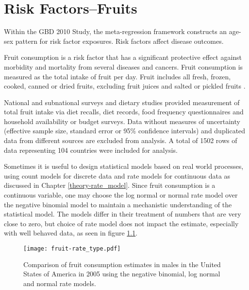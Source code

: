 \chapter{Risk Factors--Fruits}
\label{applications-log_normal}

Within the GBD 2010 Study, the meta-regression framework constructs an age-sex pattern for risk factor exposures.  Risk factors affect disease outcomes.

Fruit consumption is a risk factor that has a significant protective effect against morbidity and mortality from several diseases and cancers.  Fruit consumption is measured as the total intake of fruit per day.  Fruit includes all fresh, frozen, cooked, canned or dried fruits, excluding fruit juices and salted or pickled fruits \cite{he_increased_2007, boeing_intake_2006}.

National and subnational surveys and dietary studies provided measurement of total fruit intake via diet recalls, diet records, food frequency questionnaires and household availability or budget surveys.  Data without measures of uncertainty (effective sample size, standard error or 95\% confidence intervals) and duplicated data from different sources are excluded from analysis.  A total of 1502 rows of data representing 104 countries were included for analysis.

Sometimes it is useful to design statistical models based on real world processes, using count models for discrete data and rate models for continuous data as discussed in Chapter \ref{theory-rate_model}.  Since fruit consumption is a continuous variable, one may choose the log normal or normal rate model over the negative binomial model to maintain a mechanistic understanding of the statistical model.  The models differ in their treatment of numbers that are very close to zero, but choice of rate model does not impact the estimate, especially with well behaved data, as seen in figure \ref{fig:app-fruit rate type}.

    \begin{figure}[h]
        \begin{center}
            \texttt{[image: fruit-rate\_type.pdf]}
            \caption{Comparison of fruit consumption estimates in males in the United States of America in 2005 using the negative binomial, log normal and normal rate models.}
            \label{fig:app-fruit rate type}
        \end{center}
    \end{figure} 